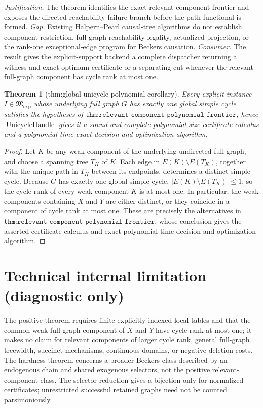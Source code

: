 \documentclass{article}
\newtheorem{theorem}{Theorem}
\begin{document}
\par\smallskip\noindent \textit{Justification.} The theorem identifies the exact relevant-component frontier and exposes the directed-reachability failure branch before the path functional is formed. \textit{Gap.} Existing Halpern--Pearl causal-tree algorithms do not establish component restriction, full-graph reachability legality, actualized projection, or the rank-one exceptional-edge program for Beckers causation. \textit{Consumer.} The result gives the explicit-support backend a complete dispatcher returning a witness and exact optimum certificate or a separating cut whenever the relevant full-graph component has cycle rank at most one.

\begin{theorem}[thm:global-unicycle-polynomial-corollary]\label{thm:global-unicycle-polynomial-corollary}
Every explicit instance \(I\in\mathfrak M_{\mathrm{exp}}\) whose underlying full graph \(G\) has exactly one global simple cycle satisfies the hypotheses of \(\texttt{thm:relevant-component-polynomial-frontier}\); hence \(\operatorname{UnicycleHandle}\) gives it a sound-and-complete polynomial-size certificate calculus and a polynomial-time exact decision and optimization algorithm.
\end{theorem}
\begin{proof}
Let \(K\) be any weak component of the underlying undirected full graph, and choose a spanning tree \(T_K\) of \(K\).  Each edge in \(E(K)\setminus E(T_K)\), together with the unique path in \(T_K\) between its endpoints, determines a distinct simple cycle.  Because \(G\) has exactly one global simple cycle, \(|E(K)\setminus E(T_K)|\le 1\), so the cycle rank of every weak component \(K\) is at most one.  In particular, the weak components containing \(X\) and \(Y\) are either distinct, or they coincide in a component of cycle rank at most one.  These are precisely the alternatives in \(\texttt{thm:relevant-component-polynomial-frontier}\), whose conclusion gives the asserted certificate calculus and exact polynomial-time decision and optimization algorithm.
\end{proof}

\section*{Technical internal limitation (diagnostic only)}

The positive theorem requires finite explicitly indexed local tables and that the common weak full-graph component of \(X\) and \(Y\) have cycle rank at most one; it makes no claim for relevant components of larger cycle rank, general full-graph treewidth, succinct mechanisms, continuous domains, or negative deletion costs. The hardness theorem concerns a broader Beckers class described by an endogenous chain and shared exogenous selectors, not the positive relevant-component class. The selector reduction gives a bijection only for normalized certificates; unrestricted successful retained graphs need not be counted parsimoniously.
\end{document}

